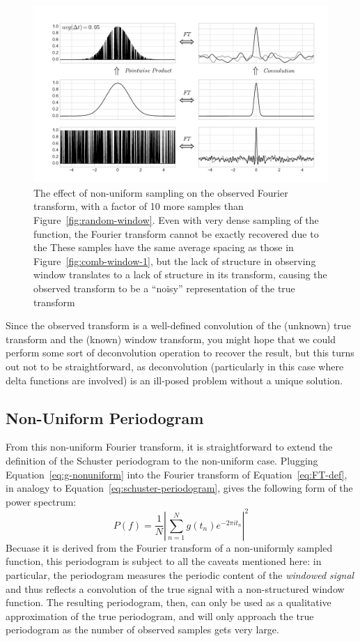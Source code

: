 \documentclass[preprint]{aastex}
\newcommand{\fig}[1]{Figure~\ref{fig:#1}}
\newcommand{\figlabel}[1]{\label{fig:#1}}
\newcommand{\Eq}[1]{Equation~\ref{eq:#1}}
\newcommand{\eq}[1]{\Eq{#1}}
\begin{document}
\begin{figure}[ht]
  \centering
  \includegraphics[width=\textwidth]{fig11_random_window_2}
  \caption{The effect of non-uniform sampling on the observed Fourier transform,
    with a factor of 10 more samples than \fig{random-window}.
    Even with very dense sampling of the function, the Fourier transform
    cannot be exactly recovered due to the 
    These samples have the same average spacing as those in \fig{comb-window-1},
    but the lack of structure in observing window translates to a lack of
    structure in its transform, causing the observed transform to be a
    ``noisy'' representation of the true transform
    \figlabel{random-window-2}}
\end{figure}

Since the observed transform is a well-defined convolution of the (unknown) true
transform and the (known) window transform, you might hope that we could
perform some sort of deconvolution operation to recover the result, but this
turns out not to be straightforward, as deconvolution (particularly in this
case where delta functions are involved) is an ill-posed problem without a
unique solution.

\subsection{Non-Uniform Periodogram}


From this non-uniform Fourier transform, it is straightforward to extend the
definition of the Schuster periodogram to the non-uniform case.
Plugging \eq{g-nonuniform} into the Fourier transform of \eq{FT-def}, in analogy to \eq{schuster-periodogram}, gives the following form of the power spectrum:
\begin{equation}
  P(f) = \frac{1}{N}\left|\sum_{n=1}^N g(t_n)e^{-2\pi i t_n} \right|^2
\end{equation}
Becuase it is derived from the Fourier transform of a non-uniformly sampled
function, this periodogram is subject to all the caveats mentioned here: in
particular, the periodogram measures the periodic content of the
{\it windowed signal} and thus reflects a convolution of the true signal
with a non-structured window function.
The resulting periodogram, then, can only be used as a qualitative approximation
of the true periodogram, and will only approach the true periodogram as the
number of observed samples gets very large.
\end{document}
